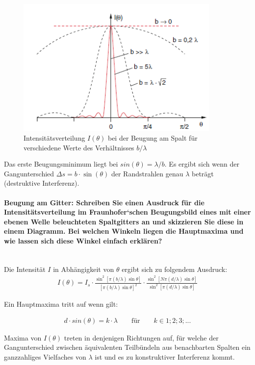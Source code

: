 \documentclass[a4paper, 11pt, ngerman, parskip=half-]{scrartcl}
\newcommand{\myparagraph}[1]{\paragraph{#1}\mbox{}\\}
\begin{document}
    \begin{figure}[H]
        \centering
        \includegraphics[width=10cm]{image/19/2.3}
        \caption{Intensitätsverteilung $I(\theta)$ bei der Beugung am Spalt für verschiedene Werte des Verhältnisses $b/\lambda$}
    \end{figure}

    Das erste Beugungsminimum liegt bei $sin(\theta) = \lambda / b$. Es ergibt sich wenn der Gangunterschied $\Delta s = b \cdot \sin(\theta)$ der Randstrahlen genau $\lambda$ beträgt (destruktive Interferenz).

    \myparagraph{Beugung am Gitter: Schreiben Sie einen Ausdruck für die Intensitätsverteilung im
        Fraunhofer‘schen Beugungsbild eines mit einer ebenen Welle beleuchteten Spaltgitters an
        und skizzieren Sie diese in einem Diagramm. Bei welchen Winkeln liegen die Hauptmaxima
        und wie lassen sich diese Winkel einfach erklären?}

    Die Intensität $I$ in Abhängigkeit von $\theta$ ergibt sich zu folgendem Ausdruck:
    \begin{align*}
        I(\theta) = I_s \cdot \frac{\sin^2[\pi (b/\lambda)\sin \theta]}{[\pi (b/\lambda) \sin \theta]^2} \cdot \frac{\sin^2 [N \pi (d/\lambda) \sin \theta]}{\sin^2[\pi (d/\lambda) \sin \theta]}
    \end{align*}

    Ein Hauptmaxima tritt auf wenn gilt:

    \begin{align*}
        d \cdot sin(\theta) = k \cdot \lambda \qquad \text{für} \qquad k \in {1;2;3;...}
    \end{align*}

    Maxima von $I(\theta)$ treten in denjenigen Richtungen auf, für welche der Gangunterschied zwischen äquivalenten Teilbündeln aus benachbarten Spalten ein ganzzahliges Vielfaches von $\lambda$ ist und es zu konstruktiver Interferenz kommt.
\end{document}
